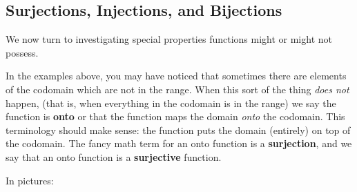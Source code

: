 \documentclass[10pt,]{book}
\newcommand{\terminology}[1]{\textbf{#1}}
\theoremstyle{plain}
\theoremstyle{definition}
\theoremstyle{definition}
\theoremstyle{definition}
\numberwithin{equation}{chapter}
\begin{document}
\subsection[{Surjections, Injections, and Bijections}]{Surjections, Injections, and Bijections}\label{subsec_surj-inj-bij}
\hypertarget{p-2123}{}%
We now turn to investigating special properties functions might or might not possess.%
\par
\hypertarget{p-2124}{}%
In the examples above, you may have noticed that sometimes there are elements of the codomain which are not in the range. When this sort of the thing \emph{does not} happen, (that is, when everything in the codomain is in the range) we say the function is \terminology{onto} or that the function maps the domain \emph{onto} the codomain. This terminology should make sense: the function puts the domain (entirely) on top of the codomain. The fancy math term for an onto function is a \terminology{surjection}, and we say that an onto function is a \terminology{surjective} function.%
\par
\hypertarget{p-2125}{}%
In pictures:%
\end{document}
